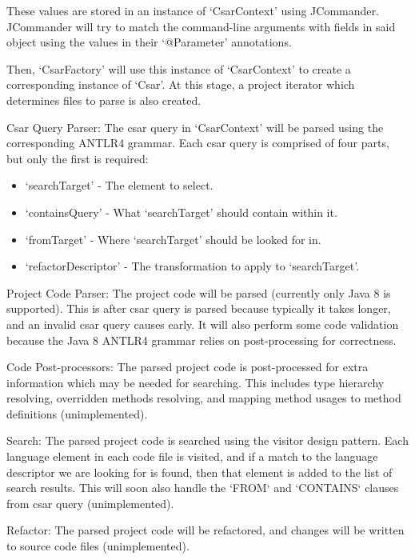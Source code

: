 \documentclass[12pt, letterpaper, oneside]{article}
\begin{document}
These values are stored in an instance of `CsarContext' using JCommander.
JCommander will try to match the command-line arguments with fields in said object using the values in their `@Parameter' annotations.

Then, `CsarFactory' will use this instance of `CsarContext' to create a corresponding instance of `Csar'.
At this stage, a project iterator which determines files to parse is also created.

Csar Query Parser:\newline
The csar query in `CsarContext' will be parsed using the corresponding ANTLR4 grammar. Each csar query is comprised of four parts, but only the first is required:
\begin{itemize}
    \item `searchTarget' - The element to select.
    \item `containsQuery' - What `searchTarget' should contain within it.
    \item `fromTarget' - Where `searchTarget' should be looked for in.
    \item `refactorDescriptor' - The transformation to apply to `searchTarget'.
\end{itemize}

Project Code Parser:\newline
The project code will be parsed (currently only Java 8 is supported).
This is after csar query is parsed because typically it takes longer, and an invalid csar query causes early.
It will also perform some code validation because the Java 8 ANTLR4 grammar relies on post-processing for correctness.

Code Post-processors:\newline
The parsed project code is post-processed for extra information which may be needed for searching.
This includes type hierarchy resolving, overridden methods resolving, and mapping method usages to method definitions (unimplemented).

Search:\newline
The parsed project code is searched using the visitor design pattern.
Each language element in each code file is visited, and if a match to the language descriptor we are looking for is found, then that element is added to the list of search results.
This will soon also handle the `FROM` and `CONTAINS` clauses from csar query (unimplemented).

Refactor:\newline
The parsed project code will be refactored, and changes will be written to source code files (unimplemented).
\end{document}
